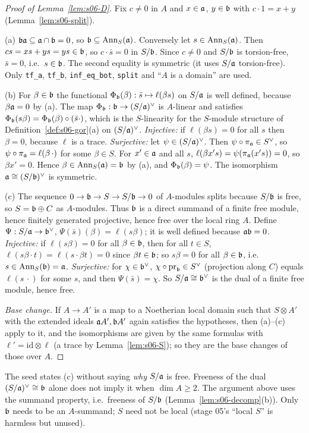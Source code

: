 \begin{proof}[Proof of Lemma~\ref{lem:s06-D}]
Fix $c\ne0$ in $A$ and $x\in\mathfrak{a}$, $y\in\mathfrak{b}$ with $c\cdot1=x+y$ (Lemma~\ref{lem:s06-split}).

(a) $\mathfrak{b}\mathfrak{a}\subseteq\mathfrak{a}\cap\mathfrak{b}=0$, so $\mathfrak{b}\subseteq\operatorname{Ann}_S(\mathfrak{a})$. Conversely let $s\in\operatorname{Ann}_S(\mathfrak{a})$. Then $cs=xs+ys=ys\in\mathfrak{b}$, so $c\cdot\bar s=0$ in
$S/\mathfrak{b}$. Since $c\ne0$ and $S/\mathfrak{b}$ is torsion-free, $\bar s=0$, i.e.\ $s\in\mathfrak{b}$. The second equality is symmetric (it uses $S/\mathfrak{a}$
torsion-free). Only \texttt{tf\_a}, \texttt{tf\_b}, \texttt{inf\_eq\_bot}, \texttt{split} and ``$A$ is a domain'' are used.

(b) For $\beta\in\mathfrak{b}$ the functional $\Phi_{\mathfrak{b}}(\beta):\bar s\mapsto\ell(\beta s)$ on $S/\mathfrak{a}$ is well defined, because $\beta\mathfrak{a}=0$ by (a). The map
$\Phi_{\mathfrak{b}}:\mathfrak{b}\to(S/\mathfrak{a})^\vee$ is $A$-linear and satisfies $\Phi_{\mathfrak{b}}(s\beta)=\Phi_{\mathfrak{b}}(\beta)\circ(\bar s\cdot)$, which is the $S$-linearity
for the $S$-module structure of Definition~\ref{def:s06-gor}(a) on $(S/\mathfrak{a})^\vee$. \emph{Injective:} if $\ell(\beta s)=0$ for all $s$ then
$\beta=0$, because $\ell$ is a trace. \emph{Surjective:} let $\psi\in(S/\mathfrak{a})^\vee$. Then $\psi\circ\pi_{\mathfrak{a}}\in S^\vee$, so
$\psi\circ\pi_{\mathfrak{a}}=\ell(\beta\,\cdot)$ for some $\beta\in S$. For $x'\in\mathfrak{a}$ and all $s$, $\ell(\beta x's)=\psi(\pi_{\mathfrak{a}}(x's))=0$, so $\beta x'=0$.
Hence $\beta\in\operatorname{Ann}_S(\mathfrak{a})=\mathfrak{b}$ by (a), and $\Phi_{\mathfrak{b}}(\beta)=\psi$. The isomorphism $\mathfrak{a}\cong(S/\mathfrak{b})^\vee$ is symmetric.

(c) The sequence $0\to\mathfrak{b}\to S\to S/\mathfrak{b}\to0$ of $A$-modules splits because $S/\mathfrak{b}$ is free, so $S=\mathfrak{b}\oplus C$ as $A$-modules. Thus $\mathfrak{b}$ is a
direct summand of a finite free module, hence finitely generated projective, hence free over the local ring $A$. Define
$\Psi:S/\mathfrak{a}\to\mathfrak{b}^\vee$, $\Psi(\bar s)(\beta)=\ell(s\beta)$; it is well defined because $\mathfrak{a}\mathfrak{b}=0$. \emph{Injective:} if $\ell(s\beta)=0$ for all
$\beta\in\mathfrak{b}$, then for all $t\in S$, $\ell(s\beta\cdot t)=\ell(s\cdot\beta t)=0$ since $\beta t\in\mathfrak{b}$; so $s\beta=0$ for all $\beta\in\mathfrak{b}$, i.e.\
$s\in\operatorname{Ann}_S(\mathfrak{b})=\mathfrak{a}$. \emph{Surjective:} for $\chi\in\mathfrak{b}^\vee$, $\chi\circ\mathrm{pr}_{\mathfrak{b}}\in S^\vee$ (projection along $C$) equals
$\ell(s\,\cdot)$ for some $s$, and then $\Psi(\bar s)=\chi$. So $S/\mathfrak{a}\cong\mathfrak{b}^\vee$ is the dual of a finite free module, hence free.

\emph{Base change.} If $A\to A'$ is a map to a Noetherian local domain such that $S\otimes A'$ with the extended ideals $\mathfrak{a} A',\mathfrak{b} A'$
again satisfies the hypotheses, then (a)--(c) apply to it, and the isomorphisms are given by the same formulas with
$\ell'=\mathrm{id}\otimes\ell$ (a trace by Lemma~\ref{lem:s06-S}); so they are the base changes of those over $A$.
\end{proof}
\noindent The seed states (c) without saying \emph{why} $S/\mathfrak{a}$ is free. Freeness of the dual $(S/\mathfrak{a})^\vee\cong\mathfrak{b}$ alone does not
imply it when $\dim A\ge2$. The argument above uses the summand property, i.e.\ freeness of $S/\mathfrak{b}$ (Lemma~\ref{lem:s06-decomp}(b)).
Only $\mathfrak{b}$ needs to be an $A$-summand; $S$ need not be local (stage 05's ``local $S$'' is harmless but unused).

